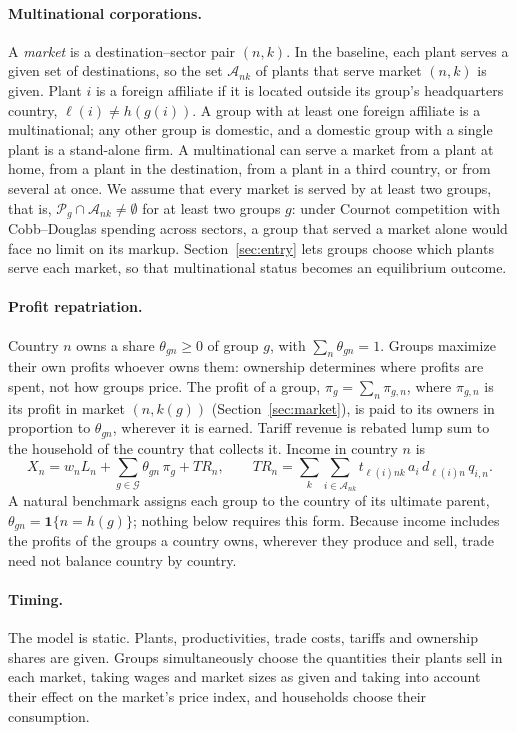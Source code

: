\documentclass[11pt]{article}
\newcommand{\cG}{\mathcal G}
\newcommand{\cP}{\mathcal P}
\newcommand{\cA}{\mathcal A}
\newcommand{\TR}{\mathit{TR}}
\begin{document}
\paragraph{Multinational corporations.} A \emph{market} is a destination--sector pair
$(n,k)$. In the baseline, each plant serves a given set of destinations, so the set
$\cA_{nk}$ of plants that serve market $(n,k)$ is given. Plant $i$ is a foreign
affiliate if it is located outside its group's headquarters country,
$\ell(i)\neq h(g(i))$. A group with at least one foreign affiliate is a multinational;
any other group is domestic, and a domestic group with a single plant is a stand-alone
firm. A multinational can serve a market from a plant at home, from a plant in the
destination, from a plant in a third country, or from several at once. We assume that
every market is served by at least two groups, that is, $\cP_g\cap\cA_{nk}\neq\emptyset$
for at least two groups $g$: under
Cournot competition with Cobb--Douglas spending across sectors, a group that served a
market alone would face no limit on its markup. Section~\ref{sec:entry} lets groups
choose which plants serve each market, so that multinational status becomes an
equilibrium outcome.

\paragraph{Profit repatriation.} Country $n$ owns a share $\theta_{gn}\ge0$ of group
$g$, with $\sum_n\theta_{gn}=1$. Groups maximize their own profits whoever owns them:
ownership determines where profits are spent, not how groups price. The profit of a
group, $\pi_g=\sum_n\pi_{g,n}$, where $\pi_{g,n}$ is its profit in market $(n,k(g))$
(Section~\ref{sec:market}), is paid to its owners in proportion to $\theta_{gn}$,
wherever it is earned. Tariff revenue is rebated lump sum to the household of the
country that collects it. Income in country $n$ is
\begin{equation}
  X_n=w_nL_n+\sum_{g\in\cG}\theta_{gn}\,\pi_g+\TR_n,
  \qquad
  \TR_n=\sum_{k}\sum_{i\in\cA_{nk}}t_{\ell(i)nk}\,a_i\,d_{\ell(i)n}\,q_{i,n}.
  \label{eq:income}
\end{equation}
A natural benchmark assigns each group to the country of its ultimate parent, $\theta_{gn}=\mathbf 1\{n=h(g)\}$; nothing below requires this form.
Because income includes the profits of the groups a country owns, wherever they
produce and sell, trade need not balance country by country.

\paragraph{Timing.} The model is static. Plants, productivities, trade costs, tariffs
and ownership shares are given. Groups simultaneously choose the quantities their
plants sell in each market, taking wages and market sizes as given and taking into
account their effect on the market's price index, and households choose their
consumption.
\end{document}
